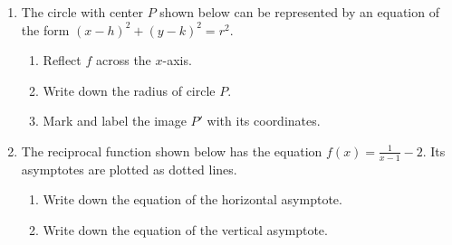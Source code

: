 \documentclass[12pt, twoside]{article}
\begin{document}
\begin{enumerate}
\item The circle with center $P$ shown below can be represented by an equation of the form $(x-h)^2+(y-k)^2=r^2$. 
  \begin{multicols}{2}
    \begin{enumerate}
      \item Reflect $f$ across the $x$-axis.
      \item Write down the radius of circle $P$.
      \item Mark and label the image $P'$ with its coordinates. \vspace{2cm}
    \end{enumerate}
    \begin{flushright}
  \end{flushright}
  \end{multicols}

\item The reciprocal function shown below has the equation $\displaystyle f(x) =\frac{1}{x-1}-2$. Its asymptotes are plotted as dotted lines.
\begin{multicols}{2}
  \begin{enumerate}
    \item Write down the equation of the horizontal asymptote. \vspace{2cm}
    \item Write down the equation of the vertical asymptote.
  \end{enumerate}
  \begin{flushright}
\end{flushright}
\end{multicols}


\end{enumerate}
\end{document}
